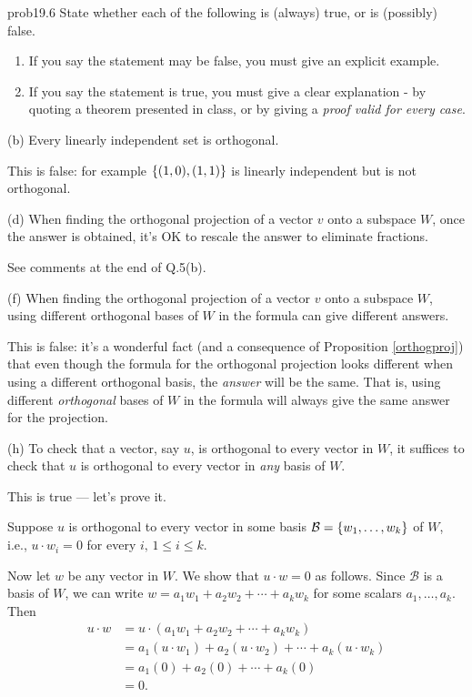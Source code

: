 \begin{sol}{prob19.6} State whether each of the following is (always) true,
or is (possibly) false.    
   \smallskip    
\begin{enumerate}[$\bullet$]
\item If you say the statement may be false, you    must give an explicit example.   
\item If you say the statement is true, you must give a clear explanation -   by quoting a theorem presented in class, or by giving a {\it proof valid for every  case}. 
\end{enumerate}
\medskip

(b) Every linearly independent set is orthogonal.

\soln This is false: for example $\{(1,0), (1,1) \}$ is linearly independent but is not orthogonal.
\medskip
%

(d) When finding the orthogonal projection of a vector $v$ onto a subspace $W$, once the answer is obtained, it's OK to rescale the answer to eliminate fractions.

 See comments at the end of Q.5(b).
\medskip

(f) When finding the orthogonal projection of a vector $v$ onto a subspace $W$, using different orthogonal bases of $W$ in the formula can give different answers.

\soln This is false: it's a wonderful fact (and a consequence of Proposition \ref{orthogproj}) that even though the formula for the orthogonal projection looks different when using  a different orthogonal basis, the {\it answer} will  be the same. That is, using different {\it orthogonal} bases of $W$ in the formula will always give the same answer for the projection.
\medskip
%

(h) To check that a vector, say $u$, is orthogonal to every vector in $W$, it suffices to check that $u$ is orthogonal to every vector in {\it any} basis of $W$.

\soln This is true --- let's prove it. 

Suppose $u$ is orthogonal to every vector in some basis $\mathcal B =\{w_1, \dots , w_k \}$ of $W$, i.e., $u\cdot w_i=0$ for every $i,\, 1\le i \le k$. 

Now let $w$ be any vector in $W$. We show that $u\cdot w=0$ as follows. Since $\mathcal B$ is a basis of $W$, we can write $w=a_1 w_1 +a_2 w_2 +\cdots +a_kw_k$ for some scalars $a_1, \dots, a_k$. Then
\begin{equation*}
\begin{split}
 u\cdot w &= u\cdot (a_1 w_1 +a_2 w_2 +\cdots +a_kw_k)\\
  &=  a_1 (u\cdot w_1) +a_2 (u\cdot w_2) +\cdots +a_k (u\cdot w_k)  \\
  &=  a_1 (0) +a_2 (0) +\cdots +a_k (0)\\
  &= 0.\\
\end{split}\end{equation*}


\end{sol}
